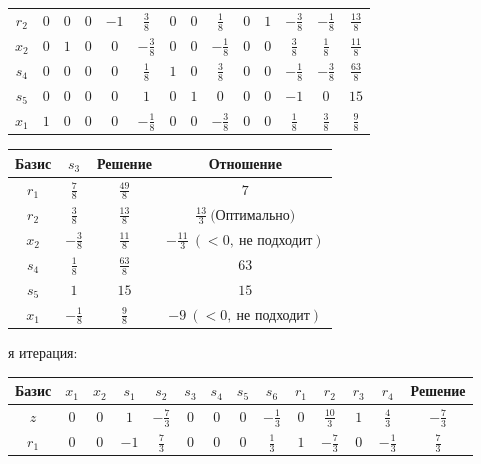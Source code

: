 \documentclass{article}%
\begin{document}
\begin{flushleft}
\begin{tabular}{|c|cccccccccccc|c|}
$r_{2}$&$0$&$0$&$0$&$-1$&$\frac{3}{8}$&$0$&$0$&$\frac{1}{8}$&$0$&$1$&$-\frac{3}{8}$&$-\frac{1}{8}$&$\frac{13}{8}$\\%
$x_{2}$&$0$&$1$&$0$&$0$&$-\frac{3}{8}$&$0$&$0$&$-\frac{1}{8}$&$0$&$0$&$\frac{3}{8}$&$\frac{1}{8}$&$\frac{11}{8}$\\%
$s_{4}$&$0$&$0$&$0$&$0$&$\frac{1}{8}$&$1$&$0$&$\frac{3}{8}$&$0$&$0$&$-\frac{1}{8}$&$-\frac{3}{8}$&$\frac{63}{8}$\\%
$s_{5}$&$0$&$0$&$0$&$0$&$1$&$0$&$1$&$0$&$0$&$0$&$-1$&$0$&$15$\\%
$x_{1}$&$1$&$0$&$0$&$0$&$-\frac{1}{8}$&$0$&$0$&$-\frac{3}{8}$&$0$&$0$&$\frac{1}{8}$&$\frac{3}{8}$&$\frac{9}{8}$\\%
\hline%
\end{tabular}%
\newline%
\newline%
\newline%
\begin{tabular}{|cccc|}%
\hline%
Базис&$s_{3}$&Решение&Отношение\\%
\hline%
$r_{1}$&$\frac{7}{8}$&$\frac{49}{8}$&$7$\\%
$r_{2}$&$\frac{3}{8}$&$\frac{13}{8}$&$\frac{13}{3}\: \text{(Оптимально)}$\\%
$x_{2}$&$-\frac{3}{8}$&$\frac{11}{8}$&$-\frac{11}{3}\: (< 0, \: \text{не подходит})$\\%
$s_{4}$&$\frac{1}{8}$&$\frac{63}{8}$&$63$\\%
$s_{5}$&$1$&$15$&$15$\\%
$x_{1}$&$-\frac{1}{8}$&$\frac{9}{8}$&$-9\: (< 0, \: \text{не подходит})$\\%
\hline%
\end{tabular}%
\newline%
\newline%
я итерация: %
\newline%
\newline%
\renewcommand{\arraystretch}{1.3}%
\begin{tabular}{|c|cccccccccccc|c|}%
\hline%
Базис&$x_{1}$&$x_{2}$&$s_{1}$&$s_{2}$&$s_{3}$&$s_{4}$&$s_{5}$&$s_{6}$&$r_{1}$&$r_{2}$&$r_{3}$&$r_{4}$&Решение\\%
\hline%
$z$&$0$&$0$&$1$&$-\frac{7}{3}$&$0$&$0$&$0$&$-\frac{1}{3}$&$0$&$\frac{10}{3}$&$1$&$\frac{4}{3}$&$-\frac{7}{3}$\\%
\hline%
$r_{1}$&$0$&$0$&$-1$&$\frac{7}{3}$&$0$&$0$&$0$&$\frac{1}{3}$&$1$&$-\frac{7}{3}$&$0$&$-\frac{1}{3}$&$\frac{7}{3}$\\%

\end{tabular}
\end{flushleft}
\end{document}
